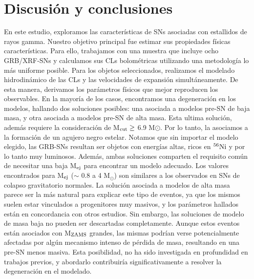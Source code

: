 \documentclass[baaa]{baaa}
\begin{document}
\section{Discusi\'on y conclusiones}
En este estudio, exploramos las características de SNs asociadas con estallidos de rayos gamma. Nuestro objetivo principal fue estimar sus propiedades físicas características. Para ello, trabajamos con una muestra que incluye ocho GRB/XRF-SNs y calculamos sus CLs bolométricas utilizando una metodología lo más uniforme posible. Para los objetos seleccionados, realizamos el modelado hidrodinámico de las CLs y las velocidades de expansión simultáneamente. De esta manera, derivamos los parámetros físicos que mejor reproducen los observables. En la mayoría de los casos, encontramos una degeneración en los modelos, hallando dos soluciones posibles: una asociada a modelos pre-SN de baja masa, y otra asociada a modelos pre-SN de alta masa. Esta ultima solución, además requiere la consideración de M$_{\rm{cut}} \geq$ 6.9 M$\odot$. Por lo tanto, la asociamos a la formación de un agujero negro estelar. Notamos que sin importar el modelo elegido, las GRB-SNs resultan ser objetos con energías altas, ricos en $^{56}\rm{Ni}$ y por lo tanto muy luminosos. Además, ambas soluciones comparten el requisito común de necesitar una baja M$_{\rm{ej}}$ para encontrar un modelo adecuado. Los valores encontrados para M$_{\rm{ej}}$ ($\sim$ 0.8 a 4 M$_\odot$) son similares a los observados en SNs de colapso gravitatorio normales. La solución asociada a modelos de alta masa parece ser la más natural para explicar este tipo de eventos, ya que los mismos suelen estar vinculados a progenitores muy masivos, y los parámetros hallados están en concordancia con otros estudios. Sin embargo, las soluciones de modelo de masa baja no pueden ser descartadas completamente. Aunque estos eventos están asociados con M$_{\rm{ZAMS}}$ grandes, las mismas podrían verse potencialmente afectadas por algún mecanismo intenso de pérdida de masa, resultando en una pre-SN menos masiva. Esta posibilidad, no ha sido investigada en profundidad en trabajos previos, y abordarlo contribuiría significativamente a resolver la degeneración en el modelado.
\end{document}
